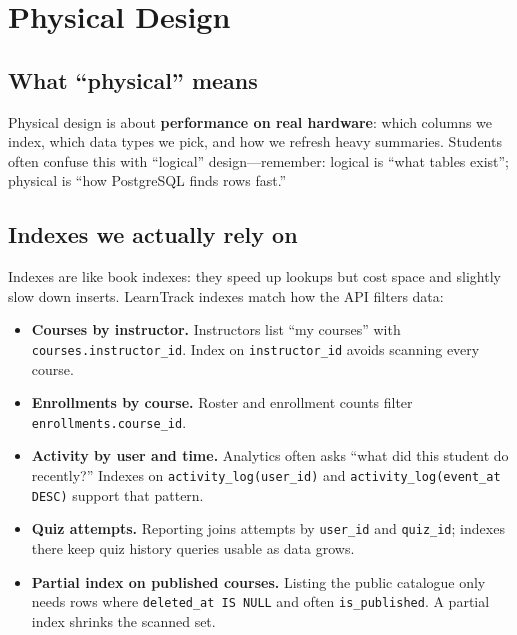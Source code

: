 
\chapter{Physical Design}
\label{ch:physical}

\section{What ``physical'' means}
Physical design is about \textbf{performance on real hardware}: which columns we index, which data types we pick, and how we refresh heavy summaries. Students often confuse this with ``logical'' design---remember: logical is ``what tables exist''; physical is ``how PostgreSQL finds rows fast.''

\section{Indexes we actually rely on}
Indexes are like book indexes: they speed up lookups but cost space and slightly slow down inserts. LearnTrack indexes match how the API filters data:

\begin{itemize}[leftmargin=*]
  \item \textbf{Courses by instructor.} Instructors list ``my courses'' with \texttt{courses.instructor\_id}. Index on \texttt{instructor\_id} avoids scanning every course.

  \item \textbf{Enrollments by course.} Roster and enrollment counts filter \texttt{enrollments.course\_id}.

  \item \textbf{Activity by user and time.} Analytics often asks ``what did this student do recently?'' Indexes on \texttt{activity\_log(user\_id)} and \texttt{activity\_log(event\_at DESC)} support that pattern.

  \item \textbf{Quiz attempts.} Reporting joins attempts by \texttt{user\_id} and \texttt{quiz\_id}; indexes there keep quiz history queries usable as data grows.

  \item \textbf{Partial index on published courses.} Listing the public catalogue only needs rows where \texttt{deleted\_at IS NULL} and often \texttt{is\_published}. A partial index shrinks the scanned set.
\end{itemize}

